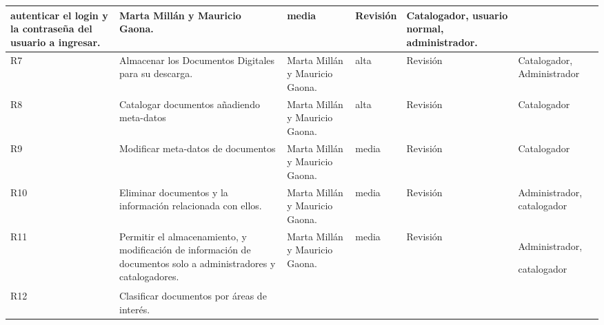 \begin{center}
\begin{longtable}{|p{0.5cm}|p{3cm}|p{2cm}|p{0.8cm}|p{1.5cm}|p{2cm}|}
autenticar el login y la contraseña del usuario a ingresar.
&	

Marta Millán y Mauricio Gaona.
&	

media
&	

Revisión
&	

Catalogador, usuario normal, administrador.\\
\hline					

R7
&	

Almacenar los Documentos Digitales para su descarga.
&	

Marta Millán y Mauricio Gaona.
&	

alta
&	

Revisión
&	

Catalogador,  Administrador\\
\hline
R8
&	

Catalogar documentos añadiendo meta-datos
&	

Marta Millán y Mauricio Gaona.
&	

alta
&	

Revisión
&	

Catalogador\\
\hline
R9
&	

Modificar meta-datos de documentos
&	

Marta Millán y Mauricio Gaona.
&	

media
&	

Revisión
&	

Catalogador\\
\hline
R10
&	

Eliminar documentos y la información relacionada con ellos.
&	

Marta Millán y Mauricio Gaona.
&	

media
&	

Revisión
&	

Administrador, catalogador\\
\hline
R11
&

Permitir el almacenamiento, y modificación de información de  documentos solo a administradores y catalogadores.
&	

Marta Millán y Mauricio Gaona.
&	

media
&	

Revisión
&	

Administrador,

catalogador\\
\hline

R12
	
&
Clasificar documentos por áreas de interés.
&	


\end{longtable}
\end{center}
